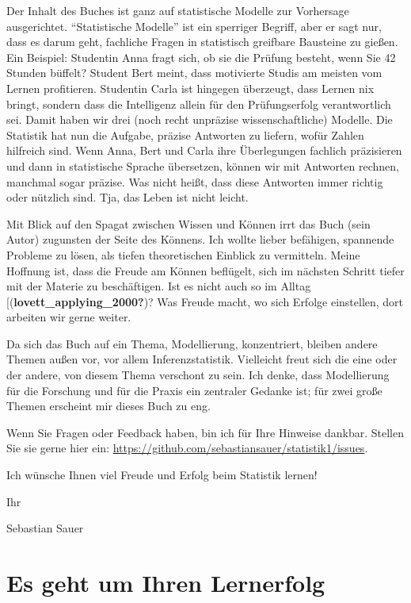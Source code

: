\documentclass[
  a4paper,
  DIV=11]{scrreprt}
\theoremstyle{definition}
\theoremstyle{definition}
\theoremstyle{definition}
\theoremstyle{remark}
\begin{document}
Der Inhalt des Buches ist ganz auf statistische Modelle zur Vorhersage
ausgerichtet. ``Statistische Modelle'' ist ein sperriger Begriff, aber
er sagt nur, dass es darum geht, fachliche Fragen in statistisch
greifbare Bausteine zu gießen. Ein Beispiel: Studentin Anna fragt sich,
ob sie die Prüfung besteht, wenn Sie 42 Stunden büffelt? Student Bert
meint, dass motivierte Studis am meisten vom Lernen profitieren.
Studentin Carla ist hingegen überzeugt, dass Lernen nix bringt, sondern
dass die Intelligenz allein für den Prüfungserfolg verantwortlich sei.
Damit haben wir drei (noch recht unpräzise wissenschaftliche) Modelle.
Die Statistik hat nun die Aufgabe, präzise Antworten zu liefern, wofür
Zahlen hilfreich sind. Wenn Anna, Bert und Carla ihre Überlegungen
fachlich präzisieren und dann in statistische Sprache übersetzen, können
wir mit Antworten rechnen, manchmal sogar präzise. Was nicht heißt, dass
diese Antworten immer richtig oder nützlich sind. Tja, das Leben ist
nicht leicht.

Mit Blick auf den Spagat zwischen Wissen und Können irrt das Buch (sein
Autor) zugunsten der Seite des Könnens. Ich wollte lieber befähigen,
spannende Probleme zu lösen, als tiefen theoretischen Einblick zu
vermitteln. Meine Hoffnung ist, dass die Freude am Können beflügelt,
sich im nächsten Schritt tiefer mit der Materie zu beschäftigen. Ist es
nicht auch so im Alltag {[}(\textbf{lovett\_applying\_2000?})? Was
Freude macht, wo sich Erfolge einstellen, dort arbeiten wir gerne
weiter.

Da sich das Buch auf ein Thema, Modellierung, konzentriert, bleiben
andere Themen außen vor, vor allem Inferenzstatistik. Vielleicht freut
sich die eine oder der andere, von diesem Thema verschont zu sein. Ich
denke, dass Modellierung für die Forschung und für die Praxis ein
zentraler Gedanke ist; für zwei große Themen erscheint mir dieses Buch
zu eng.

Wenn Sie Fragen oder Feedback haben, bin ich für Ihre Hinweise dankbar.
Stellen Sie sie gerne hier ein:
\url{https://github.com/sebastiansauer/statistik1/issues}.

Ich wünsche Ihnen viel Freude und Erfolg beim Statistik lernen!

Ihr

Sebastian Sauer

\section{Es geht um Ihren Lernerfolg}\label{es-geht-um-ihren-lernerfolg}
\end{document}
